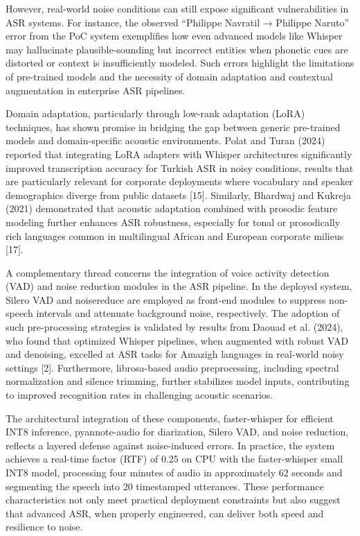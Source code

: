 \documentclass[12pt,a4paper]{article}
\begin{document}
However, real-world noise conditions can still expose significant vulnerabilities in ASR systems. For instance, the observed “Philippe Navratil → Philippe Naruto” error from the PoC system exemplifies how even advanced models like Whisper may hallucinate plausible-sounding but incorrect entities when phonetic cues are distorted or context is insufficiently modeled. Such errors highlight the limitations of pre-trained models and the necessity of domain adaptation and contextual augmentation in enterprise ASR pipelines.


Domain adaptation, particularly through low-rank adaptation (LoRA) techniques, has shown promise in bridging the gap between generic pre-trained models and domain-specific acoustic environments. Polat and Turan (2024) reported that integrating LoRA adapters with Whisper architectures significantly improved transcription accuracy for Turkish ASR in noisy conditions, results that are particularly relevant for corporate deployments where vocabulary and speaker demographics diverge from public datasets [15]. Similarly, Bhardwaj and Kukreja (2021) demonstrated that acoustic adaptation combined with prosodic feature modeling further enhances ASR robustness, especially for tonal or prosodically rich languages common in multilingual African and European corporate milieus [17].


A complementary thread concerns the integration of voice activity detection (VAD) and noise reduction modules in the ASR pipeline. In the deployed system, Silero VAD and noisereduce are employed as front-end modules to suppress non-speech intervals and attenuate background noise, respectively. The adoption of such pre-processing strategies is validated by results from Daouad et al. (2024), who found that optimized Whisper pipelines, when augmented with robust VAD and denoising, excelled at ASR tasks for Amazigh languages in real-world noisy settings [2]. Furthermore, librosa-based audio preprocessing, including spectral normalization and silence trimming, further stabilizes model inputs, contributing to improved recognition rates in challenging acoustic scenarios.


The architectural integration of these components, faster-whisper for efficient INT8 inference, pyannote-audio for diarization, Silero VAD, and noise reduction, reflects a layered defense against noise-induced errors. In practice, the system achieves a real-time factor (RTF) of 0.25 on CPU with the faster-whisper small INT8 model, processing four minutes of audio in approximately 62 seconds and segmenting the speech into 20 timestamped utterances. These performance characteristics not only meet practical deployment constraints but also suggest that advanced ASR, when properly engineered, can deliver both speed and resilience to noise.
\end{document}
